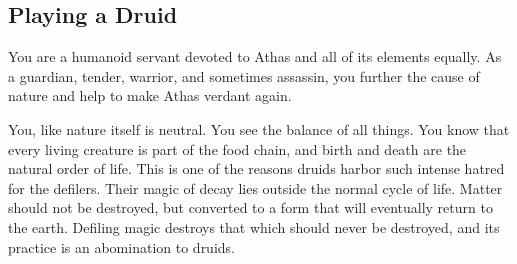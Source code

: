 



\subsection{Playing a Druid}
You are a humanoid servant devoted to Athas and all of its elements equally. As a guardian, tender, warrior, and sometimes assassin, you further the cause of nature and help to make Athas verdant again.

You, like nature itself is neutral. You see the balance of all things. You know that every living creature is part of the food chain, and birth and death are the natural order of life. This is one of the reasons druids harbor such intense hatred for the defilers. Their magic of decay lies outside the normal cycle of life. Matter should not be destroyed, but converted to a form that will eventually return to the earth. Defiling magic destroys that which should never be destroyed, and its practice is an abomination to druids.

